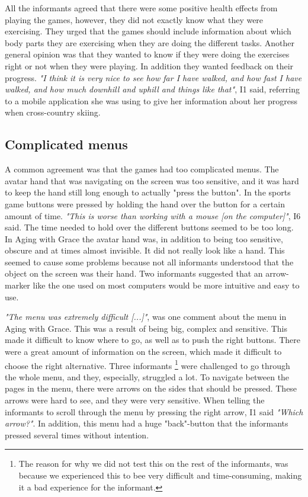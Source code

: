 All the informants agreed that there were some positive health effects from playing the games, however, they did not exactly know what they were exercising. They urged that the games should include information about which body parts they are exercising when they are doing the different tasks. Another general opinion was that they wanted to know if they were doing the exercises right or not when they were playing. In addition they wanted feedback on their progress. \emph{"I think it is very nice to see how far I have walked, and how fast I have walked, and how much downhill and uphill and things like that"}, I1 said, referring to a mobile application she was using to give her information about her progress when cross-country skiing.   

\subsection{Complicated menus}
A common agreement was that the games had too complicated menus.  The avatar hand that was navigating on the screen was too sensitive, and it was hard to keep the hand still long enough to actually "press the button". In the sports game buttons were pressed by holding the hand over the button for a certain amount of time. \emph{"This is worse than working with a mouse [on the computer]"}, I6 said. The time needed to hold over the different buttons seemed to be too long. In Aging with Grace the avatar hand was, in addition to being too sensitive, obscure and at times almost invisible. It did not really look like a hand. This seemed to cause some problems because not all informants understood that the object on the screen was their hand. Two informants suggested that an arrow-marker like the one used on most computers would be more intuitive and easy to use. 

\emph{"The menu was extremely difficult [...]"}, was one comment about the menu in Aging with Grace. This was a result of being big, complex and sensitive. This made it difficult to know where to go, as well as to push the right buttons. There were a great amount of information on the screen, which made it difficult to choose the right alternative. Three informants \footnote{The reason for why we did not test this on the rest of the informants, was because we experienced this to bee very difficult and time-consuming, making it a bad experience for the informant.} were challenged to go through the whole menu, and they, especially, struggled a lot. To navigate between the pages in the menu, there were arrows on the sides that should be pressed. These arrows were hard to see, and they were very sensitive. When telling the informants to scroll through the menu by pressing the right arrow, I1 said \emph{"Which arrow?"}. In addition, this menu had a huge "back"-button that the informants pressed several times without intention. 

